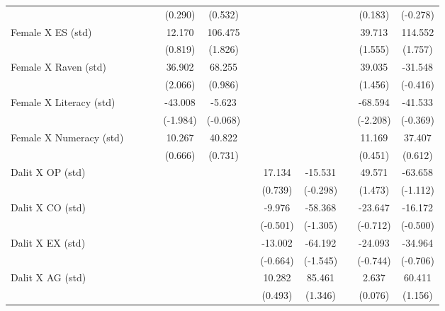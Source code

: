 {\begin{longtable}{@{\extracolsep{\fill}}lccccccccccc}
          &       &       &       & (0.290) & (0.532) &       &       &       &       & (0.183) & (-0.278) \\
    Female X ES (std) &       &       &       & 12.170 & 106.475 &       &       &       &       & 39.713 & 114.552 \\
          &       &       &       & (0.819) & (1.826) &       &       &       &       & (1.555) & (1.757) \\
    Female X Raven (std) &       &       &       & 36.902 & 68.255 &       &       &       &       & 39.035 & -31.548 \\
          &       &       &       & (2.066) & (0.986) &       &       &       &       & (1.456) & (-0.416) \\
    Female X Literacy (std) &       &       &       & -43.008 & -5.623 &       &       &       &       & -68.594 & -41.533 \\
          &       &       &       & (-1.984) & (-0.068) &       &       &       &       & (-2.208) & (-0.369) \\
    Female X Numeracy (std) &       &       &       & 10.267 & 40.822 &       &       &       &       & 11.169 & 37.407 \\
          &       &       &       & (0.666) & (0.731) &       &       &       &       & (0.451) & (0.612) \\
    Dalit X OP (std) &       &       &       &       &       &       & 17.134 & -15.531 &       & 49.571 & -63.658 \\
          &       &       &       &       &       &       & (0.739) & (-0.298) &       & (1.473) & (-1.112) \\
    Dalit X CO (std) &       &       &       &       &       &       & -9.976 & -58.368 &       & -23.647 & -16.172 \\
          &       &       &       &       &       &       & (-0.501) & (-1.305) &       & (-0.712) & (-0.500) \\
    Dalit X EX (std) &       &       &       &       &       &       & -13.002 & -64.192 &       & -24.093 & -34.964 \\
          &       &       &       &       &       &       & (-0.664) & (-1.545) &       & (-0.744) & (-0.706) \\
    Dalit X AG (std) &       &       &       &       &       &       & 10.282 & 85.461 &       & 2.637 & 60.411 \\
          &       &       &       &       &       &       & (0.493) & (1.346) &       & (0.076) & (1.156) \\

\end{longtable}}
